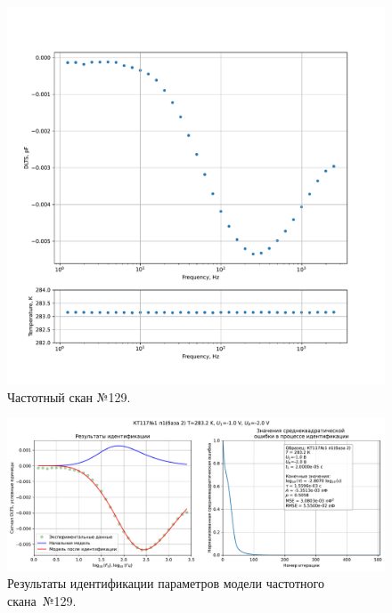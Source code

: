 \begin{figure}[!ht]
    \centering
    \includegraphics[width=1\textwidth]{../plots/КТ117№1_п1(база 2)_2500Гц-1Гц_1пФ_+10С_-1В-2В_100мВ_20мкс_шаг_0,1.pdf}
    \caption{Частотный скан №129.}
    \label{pic:frequency_scan_129}
\end{figure}

\begin{figure}[!ht]
    \centering
    \includegraphics[width=1\textwidth]{../plots/КТ117№1_п1(база 2)_2500Гц-1Гц_1пФ_+10С_-1В-2В_100мВ_20мкс_шаг_0,1_model.pdf}
    \caption{Результаты идентификации параметров модели частотного скана~№129.}
    \label{pic:frequency_scan_model129}
\end{figure}

\pagebreak


